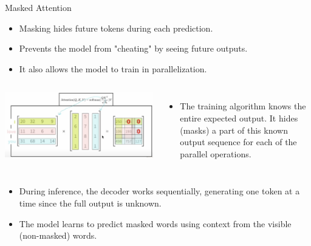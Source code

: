 \documentclass{beamer}
\begin{document}
\begin{frame}{Masked Attention}

\begin{itemize}
    \item Masking hides future tokens during each prediction.
    \item Prevents the model from "cheating" by seeing future outputs.
    \item It also allows the model to train in parallelization.
\end{itemize}

\begin{columns}

  \includegraphics[width=1\linewidth]{f16.png}\renewcommand{\thefootnote}{}

  \begin{itemize}
      \item   The training algorithm knows the entire expected output. It hides (masks) a part of this known output sequence for each of the parallel operations.
  \end{itemize}    
\end{columns}

\begin{itemize}
    \item During inference, the decoder works sequentially, generating one token at a time since the full output is unknown.
    \item The model learns to predict masked words using context from the visible (non-masked) words.
\end{itemize}

\end{frame}
\end{document}
